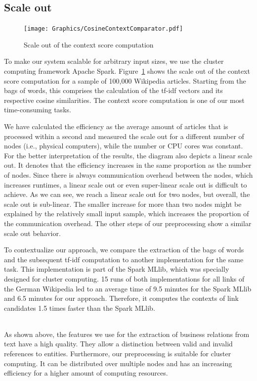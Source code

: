\subsection{Scale out}
\begin{figure}[ht]
	\centering
  \texttt{[image: Graphics/CosineContextComparator.pdf]}
	\caption{Scale out of the context score computation}
	\label{fig:scale_out}
\end{figure}

To make our system scalable for arbitrary input sizes, we use the cluster computing framework Apache Spark\footnotemark{}. Figure~\ref{fig:scale_out} shows the scale out of the context score computation for a sample of 100,000 Wikipedia articles. Starting from the bags of words, this comprises the calculation of the tf-idf vectors and its respective cosine similarities. The context score computation is one of our most time-consuming tasks.

We have calculated the efficiency as the average amount of articles that is processed within a second and measured the scale out for a different number of nodes (i.e., physical computers), while the number or CPU cores was constant. For the better interpretation of the results, the diagram also depicts a linear scale out. It denotes that the efficiency increases in the same proportion as the number of nodes. Since there is always communication overhead between the nodes, which increases runtimes, a linear scale out or even super-linear scale out is difficult to achieve. As we can see, we reach a linear scale out for two nodes, but overall, the scale out is sub-linear. The smaller increase for more than two nodes might be explained by the relatively small input sample, which increases the proportion of the communication overhead. The other steps of our preprocessing show a similar scale out behavior.

To contextualize our approach, we compare the extraction of the bags of words and the subsequent tf-idf computation to another implementation for the same task. This implementation is part of the Spark MLlib\footnotemark{}, which was specially designed for cluster computing. 15 runs of both implementations for all links of the German Wikipedia led to an average time of 9.5 minutes for the Spark MLlib and 6.5 minutes for our approach. Therefore, it computes the contexts of link candidates 1.5 times faster than the Spark MLlib.

~\\

As shown above, the features we use for the extraction of business relations from text have a high quality. They allow a distinction between valid and invalid references to entities. Furthermore, our preprocessing is suitable for cluster computing. It can be distributed over multiple nodes and has an increasing efficiency for a higher amount of computing resources.